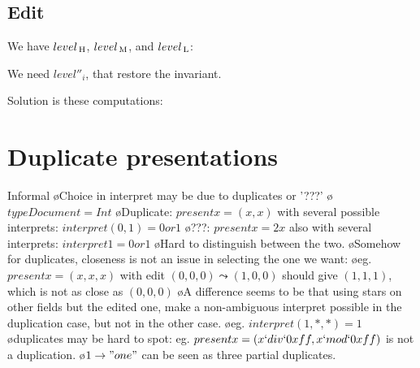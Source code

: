 

\subsection{Edit}

We have $level_{\, \mathrm H}$, $level_{\, \mathrm M}$, and $level_{\, \mathrm L}$:


We need $level''_i$,   that restore the invariant.



Solution is these computations: 

\ec


%																
%																
%																
\section{Duplicate presentations}

Informal
\bl
\o Choice in interpret may be due to duplicates or '???'
\o $type Document = Int$ 
\o Duplicate: $present x = (x,x)$ with several possible interprets: $interpret (0,1) = 0 or 1$ 
\o ???: $present x = 2x$ also with several interprets: $interpret 1 = 0 or 1$ 
\o Hard to distinguish between the two.
\o Somehow for duplicates, closeness is not an issue in selecting the one we want:
\o eg. $present x = (x,x,x)$ with edit $(0,0,0)\leadsto(1,0,0)$ should give $(1,1,1)$, which is not as close as $(0,0,0)$
\o A difference seems to be that using stars on other fields but the edited one, make a non-ambiguous interpret possible in the duplication case, but not in the other case.
\o eg. $interpret (1,*,*) = 1$
\o duplicates may be hard to spot: eg. $present x = (x `div` 0xff, x `mod` 0xff)$ is not a duplication.
\o $1 \to "one"$ can be seen as three partial duplicates. 
\el

